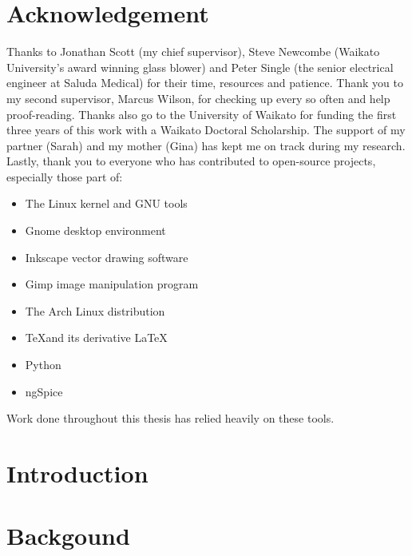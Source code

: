 \chapter*{Acknowledgement}
Thanks to Jonathan Scott (my chief supervisor), Steve Newcombe (Waikato University's award winning glass blower) and Peter Single (the senior electrical engineer at Saluda Medical) for their time, resources and patience.
Thank you to my second supervisor, Marcus Wilson, for checking up every so often and help proof-reading.
Thanks also go to the University of Waikato for funding the first three years of this work with a Waikato Doctoral Scholarship.
The support of my partner (Sarah) and my mother (Gina) has kept me on track during my research.
Lastly, thank you to everyone who has contributed to open-source projects, especially those part of:
\begin{itemize}
\item The Linux kernel and GNU tools
\item Gnome desktop environment
\item Inkscape vector drawing software
\item Gimp image manipulation program
\item The Arch Linux distribution
\item \TeX \space and its derivative \LaTeX
\item Python
\item ngSpice
\end{itemize}
Work done throughout this thesis has relied heavily on these tools.

\tableofcontents{}
\listoffigures
\listoftables
\doublespacing



 \chapter{Introduction}
   \label{chap:introduction_main}
   


 \chapter{Backgound}
   \label{chap:background}
   



